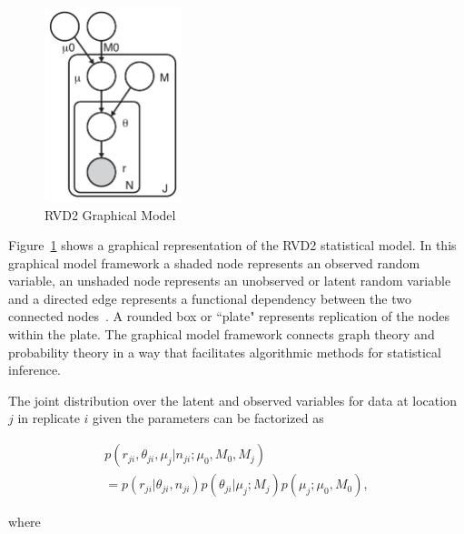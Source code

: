 \documentclass{bioinfo}
\begin{document}
\begin{figure}[h]
\begin{center}
\includegraphics[width=40mm]{pdf_figs/RVD2_model.pdf}
\caption{RVD2 Graphical Model}
\label{fig:graphical_model}
\end{center}
\end{figure}

Figure~\ref{fig:graphical_model} shows a graphical representation of the RVD2 statistical model. In this graphical model framework a shaded node represents an observed random variable, an unshaded node represents an unobserved or latent random variable and a directed edge represents a functional dependency between the two connected nodes~\citep{jordan2004graphical}. A rounded box or ``plate" represents replication of the nodes within the plate. The graphical model framework connects graph theory and probability theory in a way that facilitates algorithmic methods for statistical inference.

The joint distribution over the latent and observed variables for data at location $j$ in replicate $i$ given the parameters can be factorized as

\begin{multline}\label{eqn:jointpdf}
p \left( r_{ji}, \theta_{ji}, \mu_j | n_{ji}; \mu_0, M_0, M_j \right) \\ = p \left( r_{ji} | \theta_{ji}, n_{ji} \right) p\left( \theta_{ji} | \mu_j; M_j \right) p\left( \mu_j; \mu_0, M_0 \right),
\end{multline}


where
\end{document}
